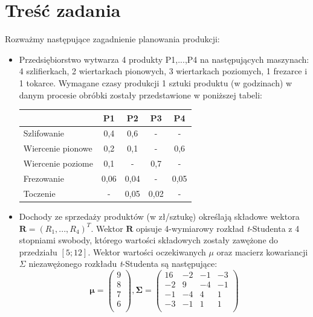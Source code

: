 \section*{Treść zadania}
Rozważmy następujące zagadnienie planowania produkcji:

\begin{itemize}
  \item Przedsiębiorstwo wytwarza 4 produkty P1,...,P4 na następujących maszynach: 4 szlifierkach, 
  2 wiertarkach pionowych, 3 wiertarkach poziomych, 1 frezarce i 1 tokarce. Wymagane czasy produkcji 
  1 sztuki produktu (w godzinach) w danym procesie obróbki zostały przedstawione w poniższej tabeli:\\
  \begin{center}
  \begin{tabular}{l*{4}{c}}
  	\hline
              			& P1 & P2 & P3 & P4 \\
	\hline
	Szlifowanie 		& 0,4 & 0,6 & - & - \\
	Wiercenie pionowe   & 0,2 & 0,1 & - & 0,6 \\
	Wiercenie poziome 	& 0,1 & - & 0,7 & -  \\
	Frezowanie  	 	& 0,06 & 0,04 & - & 0,05 \\
	Toczenie	     	& - & 0,05 & 0,02 & - \\
	\hline
	\end{tabular}
	\end{center}

  \item Dochody ze sprzedaży produktów (w zł/sztukę) określają składowe wektora 
  $\mathbf{R} = (R_{1},...,R_{4})^{T}$. Wektor $\mathbf{R}$ opisuje 4-wymiarowy rozkład 
  \textit{t}-Studenta z 4 stopniami swobody, którego wartości składowych zostały zawężone do 
  przedziału $[5;12]$. Wektor wartości oczekiwanych $\mu$ oraz macierz kowariancji 
  $\Sigma$ niezawężonego rozkładu \textit{t}-Studenta są następujące:
  \begin{displaymath}
\mathbf{\mu} = 
 \begin{pmatrix}
  9 \\ 8 \\ 7 \\ 6 \\  
 \end{pmatrix},
 \mathbf{\Sigma} = 
 \begin{pmatrix}
  16 & -2 & -1 & -3 \\
  -2 & 9 & -4 & -1 \\ 
  -1 & -4 & 4 & 1 \\
  -3 & -1 & 1 & 1 \\  
 \end{pmatrix}
  \end{displaymath}
  

\end{itemize}
